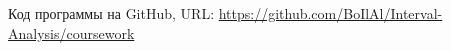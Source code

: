 \documentclass[../body.tex]{subfiles}
\begin{document}
Код программы на GitHub, URL:
\url{https://github.com/BoIlAl/Interval-Analysis/coursework}
\end{document}
